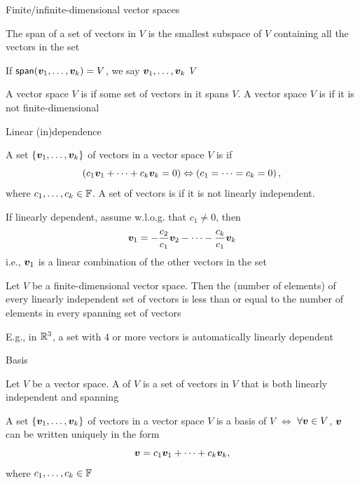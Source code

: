 \documentclass[aspectratio=169]{beamer}\usepackage[]{graphicx}\usepackage[]{xcolor}
\begin{document}
\begin{frame}{Finite/infinite-dimensional vector spaces}
	\begin{theorem}
		The span of a set of vectors in $V$ is the smallest subspace of $V$ containing all the vectors in the set
	\end{theorem}
	\vfill
	\begin{definition}
		If $\mathsf{span}(\bm{v}_1,\ldots,\bm{v}_k)=V$, we say $\bm{v}_1,\ldots,\bm{v}_k$  $V$
	\end{definition}
	\vfill
	\begin{definition}
		A vector space $V$ is  if some set of vectors in it spans $V$.
		A vector space $V$ is  if it is not finite-dimensional
	\end{definition}
\end{frame}


\begin{frame}{Linear (in)dependence}
	\begin{importantdefinition}
		A set $\{\bm{v}_1,\ldots,\bm{v}_k\}$ of vectors in a vector space $V$ is  if
		\[
		\left(c_1\bm{v}_1+\cdots+c_k\bm{v}_k=0\right)
		\Leftrightarrow
		\left(c_1=\cdots=c_k=0\right),
		\]
		where $c_1,\ldots,c_k\in\mathbb{F}$. 
		A set of vectors is  if it is not linearly independent.
	\end{importantdefinition}
	\vfill
	If linearly dependent, assume w.l.o.g. that $c_1\neq 0$, then
	\[
	\bm{v}_1 = -\frac{c_2}{c_1}\bm{v}_2-\cdots-\frac{c_k}{c_1}\bm{v}_k
	\]
	i.e., $\bm{v}_1$ is a linear combination of the other vectors in the set
\end{frame}


\begin{frame}
	\begin{theorem}
		Let $V$ be a finite-dimensional vector space. Then the  (number of elements) of every linearly independent set of vectors is less than or equal to the number of elements in every spanning set of vectors
	\end{theorem}
\vfill
E.g., in $\mathbb{R}^3$, a set with 4 or more vectors is automatically linearly dependent
\end{frame}


\begin{frame}{Basis}
	\begin{importantdefinition}[Basis]
		Let $V$ be a vector space. A  of $V$ is a set of vectors in $V$ that is both linearly independent and spanning
	\end{importantdefinition}
	\vfill
	\begin{theorem}
		A set $\{\bm{v}_1,\ldots,\bm{v}_k\}$ of vectors in a vector space $V$ is a basis of $V$ $\iff$ $\forall \bm{v}\in V$, $\bm{v}$ can be written uniquely in the form
		\[
		\bm{v}=c_1\bm{v}_1+\cdots+c_k\bm{v}_k,
		\]
		where $c_1,\ldots,c_k\in\mathbb{F}$
	\end{theorem}
\end{frame}
\end{document}
